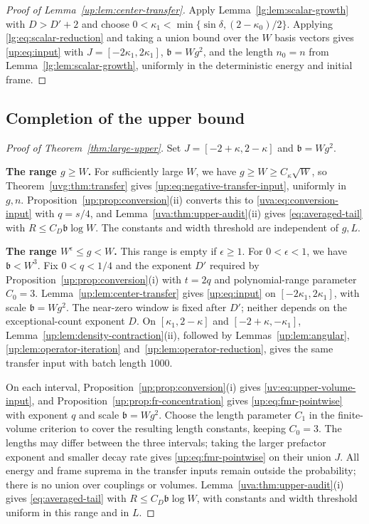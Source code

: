 \documentclass[11pt]{article}
\numberwithin{equation}{section}
\theoremstyle{remark}
\begin{document}
\begin{proof}[Proof of Lemma~\ref{up:lem:center-transfer}]
Apply Lemma~\ref{lg:lem:scalar-growth} with $D>D'+2$ and choose
$0<\kappa_1<\min\{\sin\delta,(2-\kappa_0)/2\}$.
Applying \eqref{lg:eq:scalar-reduction} and taking a union bound over
the $W$ basis vectors gives \eqref{up:eq:input} with $J=[-2\kappa_1,2\kappa_1]$, $\mathfrak b=Wg^2$, and the
length $n_0=n$ from Lemma~\ref{lg:lem:scalar-growth}, uniformly
in the deterministic energy and initial frame.
\end{proof}

\subsection*{Completion of the upper bound}

\begin{proof}[Proof of Theorem~\ref{thm:large-upper}]
Set $J=[-2+\kappa,2-\kappa]$ and $\mathfrak b=Wg^2$.

\noindent\textbf{The range $g\ge W$.}
For sufficiently large $W$, we have $g\ge W\ge C_\kappa\sqrt W$,
so Theorem~\ref{uvg:thm:transfer} gives
\eqref{up:eq:negative-transfer-input}, uniformly in $g,n$.
Proposition~\ref{up:prop:conversion}\textup{(ii)} converts this to
\eqref{uva:eq:conversion-input} with $q=s/4$, and
Lemma~\ref{uva:thm:upper-audit}\textup{(ii)} gives
\eqref{eq:averaged-tail} with $R\le C_D\mathfrak b\log W$.
The constants and width threshold are independent of $g,L$.

\noindent\textbf{The range $W^\epsilon\le g<W$.}
This range is empty if $\epsilon\ge1$. For $0<\epsilon<1$, we have
$\mathfrak b<W^3$. Fix $0<q<1/4$ and the exponent $D'$ required by
Proposition~\ref{up:prop:conversion}\textup{(i)} with $t=2q$
and polynomial-range parameter $C_0=3$.
Lemma~\ref{up:lem:center-transfer} gives \eqref{up:eq:input}
on $[-2\kappa_1,2\kappa_1]$, with scale $\mathfrak b=Wg^2$.
The near-zero window is fixed after $D'$; neither depends on the
exceptional-count exponent $D$.
On $[\kappa_1,2-\kappa]$ and $[-2+\kappa,-\kappa_1]$,
Lemma~\ref{up:lem:density-contraction}\textup{(ii)}, followed by
Lemmas~\ref{up:lem:angular}, \ref{up:lem:operator-iteration}
and~\ref{up:lem:operator-reduction}, gives the same transfer input
with batch length $1000$.

On each interval, Proposition~\ref{up:prop:conversion}\textup{(i)}
gives \eqref{uv:eq:upper-volume-input}, and
Proposition~\ref{up:prop:fr-concentration} gives
\eqref{up:eq:fmr-pointwise} with exponent $q$ and scale
$\mathfrak b=Wg^2$. Choose the length parameter $C_1$ in the finite-volume
criterion to cover the resulting length constants, keeping $C_0=3$.
The lengths may differ between the three intervals; taking the larger
prefactor exponent and smaller decay rate gives
\eqref{up:eq:fmr-pointwise} on their union $J$.
All energy and frame suprema in the transfer inputs remain outside
the probability; there is no union over couplings or volumes.
Lemma~\ref{uva:thm:upper-audit}\textup{(i)} gives
\eqref{eq:averaged-tail} with $R\le C_D\mathfrak b\log W$,
with constants and width threshold uniform in this range and in $L$.


\end{proof}
\end{document}
